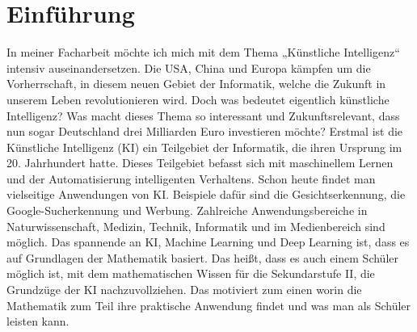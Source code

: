 \chapter{Einführung}
In meiner Facharbeit möchte ich mich mit dem Thema „Künstliche Intelligenz“ intensiv auseinandersetzen. Die USA, China und Europa kämpfen um die Vorherrschaft, in diesem neuen Gebiet der Informatik, welche die Zukunft in unserem Leben revolutionieren wird. Doch was bedeutet eigentlich künstliche Intelligenz? Was macht dieses Thema so interessant und Zukunftsrelevant, dass nun sogar Deutschland drei Milliarden Euro investieren möchte? Erstmal ist die Künstliche Intelligenz (KI) ein Teilgebiet der Informatik, die ihren Ursprung im 20. Jahrhundert hatte. Dieses Teilgebiet befasst sich mit maschinellem Lernen und der Automatisierung intelligenten Verhaltens. Schon heute findet man vielseitige Anwendungen von KI. Beispiele dafür sind die Gesichtserkennung, die Google-Sucherkennung und Werbung. Zahlreiche Anwendungsbereiche in Naturwissenschaft, Medizin, Technik, Informatik und im Medienbereich sind möglich. Das spannende an KI, Machine Learning und Deep Learning ist, dass es auf Grundlagen der Mathematik basiert. Das heißt, dass es auch einem Schüler möglich ist, mit dem mathematischen Wissen für die Sekundarstufe II, die Grundzüge der KI nachzuvollziehen. Das motiviert zum einen worin die Mathematik zum Teil ihre praktische Anwendung findet und was man als Schüler leisten kann. 
